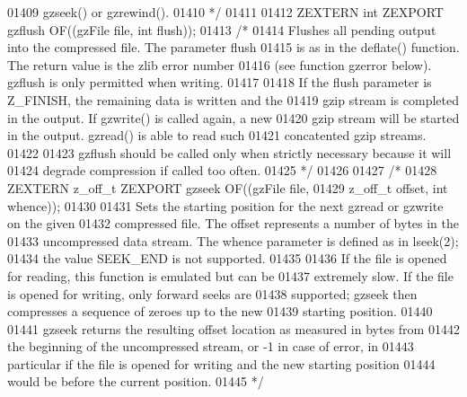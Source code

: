 \begin{DoxyCode}
01409 \textcolor{comment}{   gzseek() or gzrewind().}
01410 \textcolor{comment}{*/}
01411 
01412 ZEXTERN \textcolor{keywordtype}{int} ZEXPORT gzflush OF((gzFile file, \textcolor{keywordtype}{int} flush));
01413 \textcolor{comment}{/*}
01414 \textcolor{comment}{     Flushes all pending output into the compressed file.  The parameter flush}
01415 \textcolor{comment}{   is as in the deflate() function.  The return value is the zlib error number}
01416 \textcolor{comment}{   (see function gzerror below).  gzflush is only permitted when writing.}
01417 \textcolor{comment}{}
01418 \textcolor{comment}{     If the flush parameter is Z\_FINISH, the remaining data is written and the}
01419 \textcolor{comment}{   gzip stream is completed in the output.  If gzwrite() is called again, a new}
01420 \textcolor{comment}{   gzip stream will be started in the output.  gzread() is able to read such}
01421 \textcolor{comment}{   concatented gzip streams.}
01422 \textcolor{comment}{}
01423 \textcolor{comment}{     gzflush should be called only when strictly necessary because it will}
01424 \textcolor{comment}{   degrade compression if called too often.}
01425 \textcolor{comment}{*/}
01426 
01427 \textcolor{comment}{/*}
01428 \textcolor{comment}{ZEXTERN z\_off\_t ZEXPORT gzseek OF((gzFile file,}
01429 \textcolor{comment}{                                   z\_off\_t offset, int whence));}
01430 \textcolor{comment}{}
01431 \textcolor{comment}{     Sets the starting position for the next gzread or gzwrite on the given}
01432 \textcolor{comment}{   compressed file.  The offset represents a number of bytes in the}
01433 \textcolor{comment}{   uncompressed data stream.  The whence parameter is defined as in lseek(2);}
01434 \textcolor{comment}{   the value SEEK\_END is not supported.}
01435 \textcolor{comment}{}
01436 \textcolor{comment}{     If the file is opened for reading, this function is emulated but can be}
01437 \textcolor{comment}{   extremely slow.  If the file is opened for writing, only forward seeks are}
01438 \textcolor{comment}{   supported; gzseek then compresses a sequence of zeroes up to the new}
01439 \textcolor{comment}{   starting position.}
01440 \textcolor{comment}{}
01441 \textcolor{comment}{     gzseek returns the resulting offset location as measured in bytes from}
01442 \textcolor{comment}{   the beginning of the uncompressed stream, or -1 in case of error, in}
01443 \textcolor{comment}{   particular if the file is opened for writing and the new starting position}
01444 \textcolor{comment}{   would be before the current position.}
01445 \textcolor{comment}{*/}

\end{DoxyCode}
